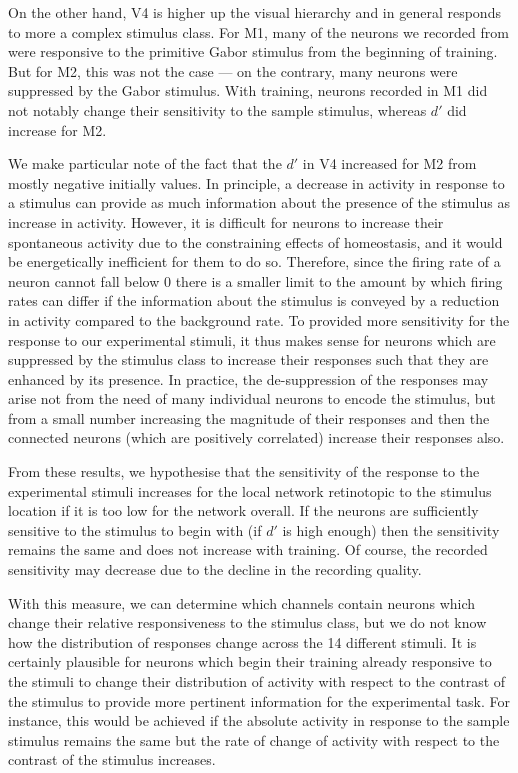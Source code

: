 On the other hand, \ac{V4} is higher up the visual hierarchy and in general responds to more a complex stimulus class.
For \ac{M1}, many of the neurons we recorded from were responsive to the primitive Gabor stimulus from the beginning of training.
But for \ac{M2}, this was not the case --- on the contrary, many neurons were suppressed by the Gabor stimulus.
With training, neurons recorded in \ac{M1} did not notably change their sensitivity to the sample stimulus, whereas $d'$ did increase for \ac{M2}.

We make particular note of the fact that the $d'$ in \ac{V4} increased for \ac{M2} from mostly negative initially values.
In principle, a decrease in activity in response to a stimulus can provide as much information about the presence of the stimulus as increase in activity.
However, it is difficult for neurons to increase their spontaneous activity due to the constraining effects of homeostasis, and it would be energetically inefficient for them to do so.
Therefore, since the firing rate of a neuron cannot fall below $0$ there is a smaller limit to the amount by which firing rates can differ if the information about the stimulus is conveyed by a reduction in activity compared to the background rate.
To provided more sensitivity for the response to our experimental stimuli, it thus makes sense for neurons which are suppressed by the stimulus class to increase their responses such that they are enhanced by its presence.
In practice, the de-suppression of the responses may arise not from the need of many individual neurons to encode the stimulus, but from a small number increasing the magnitude of their responses and then the connected neurons (which are positively correlated) increase their responses also.

From these results, we hypothesise that the sensitivity of the response to the experimental stimuli increases for the local network retinotopic to the stimulus location if it is too low for the network overall.
If the neurons are sufficiently sensitive to the stimulus to begin with (if $d'$ is high enough) then the sensitivity remains the same and does not increase with training.
Of course, the recorded sensitivity may decrease due to the decline in the recording quality.

With this measure, we can determine which channels contain neurons which change their relative responsiveness to the stimulus class, but we do not know how the distribution of responses change across the 14 different stimuli.
It is certainly plausible for neurons which begin their training already responsive to the stimuli to change their distribution of activity with respect to the contrast of the stimulus to provide more pertinent information for the experimental task.
For instance, this would be achieved if the absolute activity in response to the sample stimulus remains the same but the rate of change of activity with respect to the contrast of the stimulus increases.


